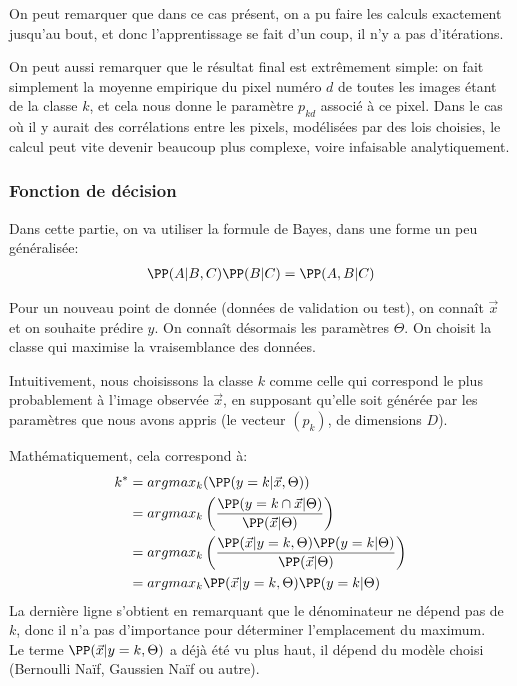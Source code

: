 \documentclass[french,twoside]{article}
\begin{document}
On peut remarquer que dans ce cas présent, on a pu faire les calculs exactement jusqu'au bout, et donc l'apprentissage se fait d'un coup, il n'y a pas d'itérations.

On peut aussi remarquer que le résultat final est extrêmement simple: on fait simplement la moyenne empirique du pixel numéro $d$ de toutes les images étant de la classe $k$, et cela nous donne le paramètre $p_{kd}$ associé à ce pixel.
Dans le cas où il y aurait des corrélations entre les pixels, modélisées par des lois choisies, le calcul peut vite devenir beaucoup plus complexe, voire infaisable analytiquement.

\subsubsection{Fonction de décision}

Dans cette partie, on va utiliser la formule de Bayes, dans une forme un peu généralisée:
\begin{align}
\PP(A|B,C)\PP(B|C) = \PP(A,B|C)
\end{align}

Pour un nouveau point de donnée (données de validation ou test), on connaît $\vec{x}$ et on souhaite prédire $y$.
On connaît désormais les paramètres $\Theta$. On choisit la classe qui maximise la vraisemblance des données.

Intuitivement, nous choisissons la classe $k$ comme celle qui correspond le plus probablement à l'image observée $\vec{x}$, en supposant qu'elle soit générée par les paramètres que nous avons appris (le vecteur $(p_k)$, de dimensions $D$).


Mathématiquement, cela correspond à:
\begin{align}
k^*
&= argmax_k( \PP (y=k| \vec{x}, \Theta ) ) \\
&= argmax_k\left( \frac{\PP (y=k \cap \vec{x} | \Theta ) }{\PP (\vec{x} | \Theta)} \right) \\
&= argmax_k\left( \frac{\PP (\vec{x}| y=k, \Theta   ) \PP(y=k|\Theta) }{\PP (\vec{x}| \Theta )} \right) \\
&= argmax_k  \PP (\vec{x}| y=k, \Theta   ) \PP(y=k|\Theta)
\end{align}
La dernière ligne s'obtient en remarquant que le dénominateur ne dépend pas de $k$, donc il n'a pas d'importance pour déterminer l'emplacement du maximum. \\

Le terme $ \PP (\vec{x}| y=k, \Theta   )$ a déjà été vu plus haut, il dépend du modèle choisi (Bernoulli Naïf, Gaussien Naïf ou autre).
\\
\end{document}

